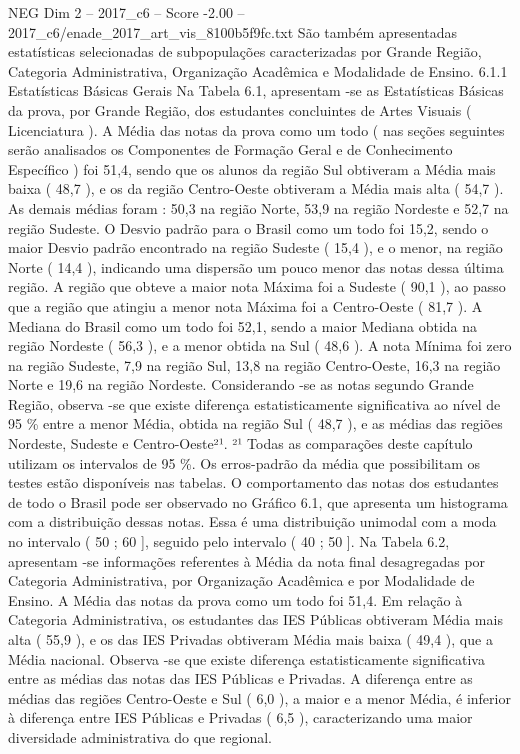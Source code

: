 \begin{textsample}{NEG Dim 2 – 2017\_c6 – Score -2.00 – 2017\_c6/enade\_2017\_art\_vis\_8100b5f9fc.txt}
São também apresentadas estatísticas selecionadas de subpopulações caracterizadas por Grande Região, Categoria Administrativa, Organização Acadêmica e Modalidade de Ensino. 6.1.1 Estatísticas Básicas Gerais Na Tabela 6.1, apresentam -se as Estatísticas Básicas da prova, por Grande Região, dos estudantes concluintes de Artes Visuais ( Licenciatura ).
A Média das notas da prova como um todo ( nas seções seguintes serão analisados os Componentes de Formação Geral e de Conhecimento Específico ) foi 51,4, sendo que os alunos da região Sul obtiveram a Média mais baixa ( 48,7 ), e os da região Centro-Oeste obtiveram a Média mais alta ( 54,7 ).
As demais médias foram : 50,3 na região Norte, 53,9 na região Nordeste e 52,7 na região Sudeste.
O Desvio padrão para o Brasil como um todo foi 15,2, sendo o maior Desvio padrão encontrado na região Sudeste ( 15,4 ), e o menor, na região Norte ( 14,4 ), indicando uma dispersão um pouco menor das notas dessa última região.
A região que obteve a maior nota Máxima foi a Sudeste ( 90,1 ), ao passo que a região que atingiu a menor nota Máxima foi a Centro-Oeste ( 81,7 ).
A Mediana do Brasil como um todo foi 52,1, sendo a maior Mediana obtida na região Nordeste ( 56,3 ), e a menor obtida na Sul ( 48,6 ).
A nota Mínima foi zero na região Sudeste, 7,9 na região Sul, 13,8 na região Centro-Oeste, 16,3 na região Norte e 19,6 na região Nordeste.
Considerando -se as notas segundo Grande Região, observa -se que existe diferença estatisticamente significativa ao nível de 95 \% entre a menor Média, obtida na região Sul ( 48,7 ), e as médias das regiões Nordeste, Sudeste e Centro-Oeste²¹. ²¹ Todas as comparações deste capítulo utilizam os intervalos de 95 \%.
Os erros-padrão da média que possibilitam os testes estão disponíveis nas tabelas.
O comportamento das notas dos estudantes de todo o Brasil pode ser observado no Gráfico 6.1, que apresenta um histograma com a distribuição dessas notas.
Essa é uma distribuição unimodal com a moda no intervalo ( 50 ; 60 ], seguido pelo intervalo ( 40 ; 50 ].
Na Tabela 6.2, apresentam -se informações referentes à Média da nota final desagregadas por Categoria Administrativa, por Organização Acadêmica e por Modalidade de Ensino.
A Média das notas da prova como um todo foi 51,4.
Em relação à Categoria Administrativa, os estudantes das IES Públicas obtiveram Média mais alta ( 55,9 ), e os das IES Privadas obtiveram Média mais baixa ( 49,4 ), que a Média nacional.
Observa -se que existe diferença estatisticamente significativa entre as médias das notas das IES Públicas e Privadas.
A diferença entre as médias das regiões Centro-Oeste e Sul ( 6,0 ), a maior e a menor Média, é inferior à diferença entre IES Públicas e Privadas ( 6,5 ), caracterizando uma maior diversidade administrativa do que regional.

\end{textsample}
